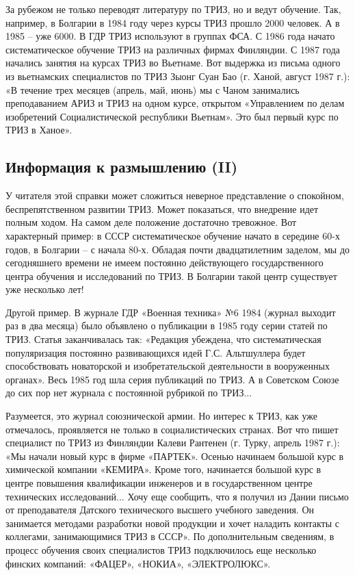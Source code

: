 \documentclass[11pt,a4paper]{article}
\begin{document}
За рубежом не только переводят литературу по ТРИЗ, но и ведут обучение. Так,
например, в Болгарии в 1984 году через курсы ТРИЗ прошло 2000 человек. А в
1985 -- уже 6000. В ГДР ТРИЗ используют в группах ФСА. С 1986 года начато
систематическое обучение ТРИЗ на различных фирмах Финляндии. С 1987 года
начались занятия на курсах ТРИЗ во Вьетнаме. Вот выдержка из письма одного из
вьетнамских специалистов по ТРИЗ Зыонг Суан Бао (г. Ханой, август 1987 г.): «В
течение трех месяцев (апрель, май, июнь) мы с Чаном занимались преподаванием
АРИЗ и ТРИЗ на одном курсе, открытом «Управлением по делам изобретений
Социалистической республики Вьетнам». Это был первый курс по ТРИЗ в Ханое».

\subsection{Информация к размышлению (II)}

У читателя этой справки может сложиться неверное представление о спокойном,
беспрепятственном развитии ТРИЗ. Может показаться, что внедрение идет полным
ходом. На самом деле положение достаточно тревожное. Вот характерный пример: в
СССР систематическое обучение начато в середине 60-х годов, в Болгарии -- с
начала 80-х. Обладая почти двадцатилетним заделом, мы до сегодняшнего времени
не имеем постоянно действующего государственного центра обучения и
исследований по ТРИЗ. В Болгарии такой центр существует уже несколько лет!

Другой пример. В журнале ГДР «Военная техника» №6 1984 (журнал выходит раз в
два месяца) было объявлено о публикации в 1985 году серии статей по ТРИЗ.
Статья заканчивалась так: «Редакция убеждена, что систематическая
популяризация постоянно развивающихся идей Г.С. Альтшуллера будет
способствовать новаторской и изобретательской деятельности в вооруженных
органах». Весь 1985 год шла серия публикаций по ТРИЗ. А в Советском Союзе до
сих пор нет журнала с постоянной рубрикой по ТРИЗ...

Разумеется, это журнал союзнической армии. Но интерес к ТРИЗ, как уже
отмечалось, проявляется не только в социалистических странах. Вот что пишет
специалист по ТРИЗ из Финляндии Калеви Рантенен (г. Турку, апрель 1987 г.):
«Мы начали новый курс в фирме «ПАРТЕК». Осенью начинаем большой курс в
химической компании «КЕМИРА». Кроме того, начинается большой курс в центре
повышения квалификации инженеров и в государственном центре технических
исследований... Хочу еще сообщить, что я получил из Дании письмо от
преподавателя Датского технического высшего учебного заведения. Он занимается
методами разработки новой продукции и хочет наладить контакты с коллегами,
занимающимися ТРИЗ в СССР». По дополнительным сведениям, в процесс обучения
своих специалистов ТРИЗ подключилось еще несколько финских компаний: «ФАЦЕР»,
«НОКИА», «ЭЛЕКТРОЛЮКС».
\end{document}
